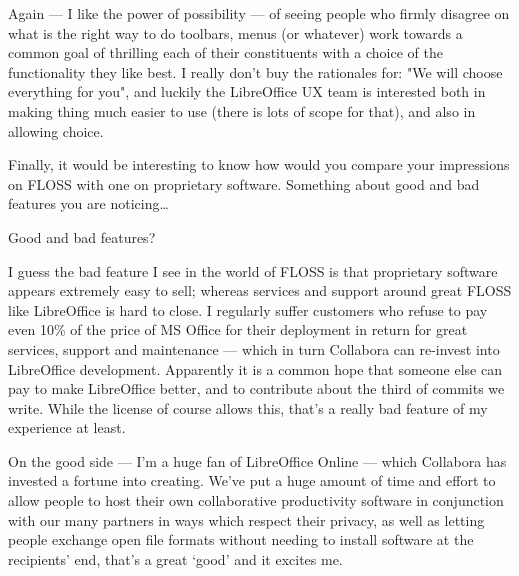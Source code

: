 \documentclass[10pt, a5paper]{article}
\begin{document}
\begin{Parallel}[p]{}{}
{\a Again — I like the power of possibility — of seeing people who firmly disagree on what is the right way to do toolbars, menus (or whatever) work towards a common goal of thrilling each of their constituents with a choice of the functionality they like best. I really don't buy the rationales for: "We will choose everything for you", and luckily the LibreOffice UX team is interested both in making thing much easier to use (there is lots of scope for that), and also in allowing choice.

\q Finally, it would be interesting to know how would you compare your impressions on FLOSS with one on proprietary software. Something about good and bad features you are noticing…

\a Good and bad features?

\a I guess the bad feature I see in the world of FLOSS is that proprietary software appears extremely easy to sell; whereas services and support around great FLOSS like LibreOffice is hard to close. I regularly suffer customers who refuse to pay even 10\% of the price of MS Office for their deployment in return for great services, support and maintenance — which in turn Collabora can re-invest into LibreOffice development. Apparently it is a common hope that someone else can pay to make LibreOffice better, and to contribute about the third of commits we write. While the license of course allows this, that's a really bad feature of my experience at least.

On the good side — I'm a huge fan of LibreOffice Online — which Collabora has invested a fortune into creating. We've put a huge amount of time and effort to allow people to host their own collaborative productivity software in conjunction with our many partners in ways which respect their privacy, as well as letting people exchange open file formats without needing to install software at the recipients' end, that's a great ‘good’ and it excites me.

     }
\end{Parallel}
\end{document}
